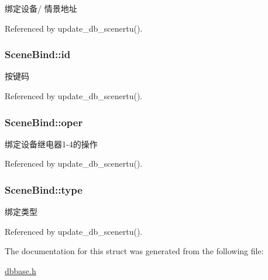 绑定设备/ 情景地址 



Referenced by update\-\_\-db\-\_\-scenertu().

\hypertarget{structSceneBind_a92e50caa085d61d80804f44eef26c240}{
\subsubsection[{id}]{ Scene\-Bind\-::id}}\label{structSceneBind_a92e50caa085d61d80804f44eef26c240}


按键码 



Referenced by update\-\_\-db\-\_\-scenertu().

\hypertarget{structSceneBind_abf48651d36a041e163a0c1ecac190288}{
\subsubsection[{oper}]{ Scene\-Bind\-::oper}}\label{structSceneBind_abf48651d36a041e163a0c1ecac190288}


绑定设备继电器1-\/4的操作 



Referenced by update\-\_\-db\-\_\-scenertu().

\hypertarget{structSceneBind_a3d49ad98d2ccb1be6cf4f55be61b0390}{
\subsubsection[{type}]{ Scene\-Bind\-::type}}\label{structSceneBind_a3d49ad98d2ccb1be6cf4f55be61b0390}


绑定类型 



Referenced by update\-\_\-db\-\_\-scenertu().



The documentation for this struct was generated from the following file\-:\begin{DoxyCompactItemize}
\item 
\hyperlink{dbbase_8h}{dbbase.\-h}\end{DoxyCompactItemize}
